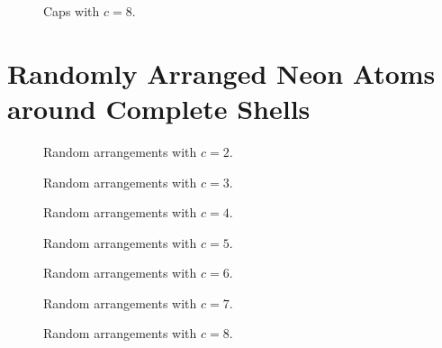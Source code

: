 \begin{figure}[h]
\begin{minipage}{0.48\textwidth}
    \centering
    
    \caption{Caps with $c=8$.}
    \label{cap08}
\end{minipage}
\hfill
\begin{minipage}{0.48\textwidth}
    \centering
\end{minipage}
\end{figure}

\clearpage
\pagebreak

\section{Randomly Arranged Neon Atoms around Complete Shells}
\begin{figure}[h]
\begin{minipage}{0.48\textwidth}
    \centering
    
    \caption{Random arrangements with $c=2$.}
    \label{random-core02}
\end{minipage}
\hfill
\begin{minipage}{0.48\textwidth}
    \centering
    
    \caption{Random arrangements with $c=3$.}
    \label{random-core03}
\end{minipage}
\end{figure}

\begin{figure}[h]
\begin{minipage}{0.48\textwidth}
    \centering
    
    \caption{Random arrangements with $c=4$.}
    \label{random-core04}
\end{minipage}
\hfill
\begin{minipage}{0.48\textwidth}
    \centering
    
    \caption{Random arrangements with $c=5$.}
    \label{random-core05}
\end{minipage}
\end{figure}

\begin{figure}[h]
\begin{minipage}{0.48\textwidth}
    \centering
    
    \caption{Random arrangements with $c=6$.}
    \label{random-core06}
\end{minipage}
\hfill
\begin{minipage}{0.48\textwidth}
    \centering
    
    \caption{Random arrangements with $c=7$.}
    \label{random-core07}
\end{minipage}
\end{figure}

\begin{figure}[h]
\begin{minipage}{0.48\textwidth}
    \centering
    
    \caption{Random arrangements with $c=8$.}
    \label{random-core08}
\end{minipage}
\hfill
\begin{minipage}{0.48\textwidth}
    \centering
\end{minipage}
\end{figure}


